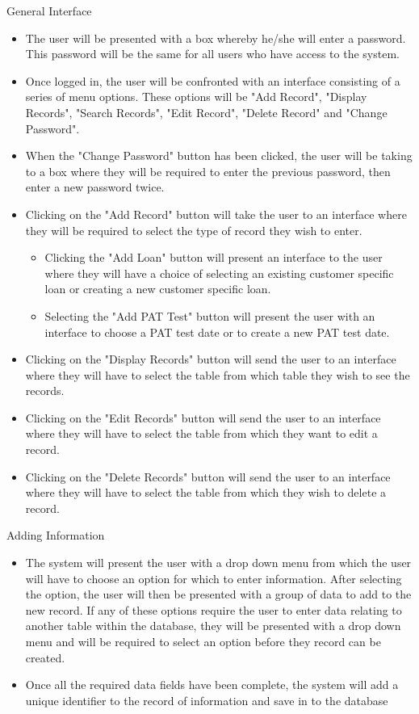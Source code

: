 General Interface
\begin{itemize}
    \item The user will be presented with a box whereby he/she will enter a password. This password will be the same for all users who have access to the system.
    \item Once logged in, the user will be confronted with an interface consisting of a series of menu options. These options will be "Add Record", "Display Records", "Search Records", "Edit Record", "Delete Record" and "Change Password".
    \item When the "Change Password" button has been clicked, the user will be taking to a box where they will be required to enter the previous password, then enter a new password twice.
    \item Clicking on the "Add Record" button will take the user to an interface where they will be required to select the type of record they wish to enter.
    \begin{itemize}
        \item Clicking the "Add Loan" button will present an interface to the user where they will have a choice of selecting an existing customer specific loan or creating a new customer specific loan.
        \item Selecting the "Add PAT Test" button will present the user with an interface to choose a PAT test date or to create a new PAT test date.
    \end{itemize}
    \item Clicking on the "Display Records" button will send the user to an interface where they will have to select the table from which table they wish to see the records.
    \item Clicking on the "Edit Records" button will send the user to an interface where they will have to select the table from which they want to edit a record.
    \item Clicking on the "Delete Records" button will send the user to an interface where they will have to select the table from which they wish to delete a record.
\end{itemize}

Adding Information
\begin{itemize}
    \item The system will present the user with a drop down menu from which the user will have to choose an option for which to enter information. After selecting the option, the user will then be presented with a group of data to add to the new record. If any of these options require the user to enter data relating to another table within the database, they will be presented with a drop down menu and will be required to select an option before they record can be created.
    \item Once all the required data fields have been complete, the system will add a unique identifier to the record of information and save in to the database
\end{itemize}


